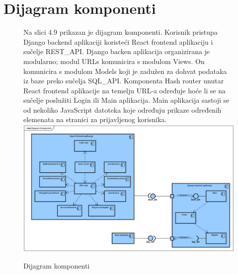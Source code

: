 			\eject

		\section{Dijagram komponenti}
		
			\begin{figure}[H]
				Na slici 4.9 prikazan je dijagram komponenti. Korisnik pristupa Django backend aplikaciji koristeći React frontend aplikaciju i sučelje REST\_API. Django
				backen aplikacija organizirana je modularno; modul URLs komunicira s modulom Views. On komunicira s modulom Models koji je zadužen za dohvat podataka iz
				baze preko sučelja SQL\_API. Komponenta Hash router unutar React frontend aplikacije na temelju URL-a određuje hoće li se na sučelje poslužiti Login ili
				Main aplikacija. Main aplikacija sastoji se od nekoliko JavaScript datoteka koje određuju prikaze određenih elemenata na stranici za prijavljenog korisnika.
				\newline
				\includegraphics[width=\textwidth]{slike/Component.png}
				\caption{Dijagram komponenti}
				\label{fig:Component}
			\end{figure}
